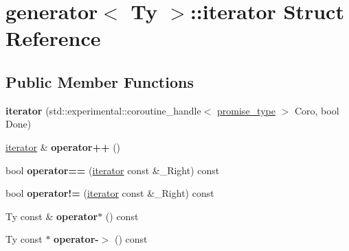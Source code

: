 \hypertarget{structgenerator_1_1iterator}{}\section{generator$<$ Ty $>$\+:\+:iterator Struct Reference}
\label{structgenerator_1_1iterator}
\subsection*{Public Member Functions}
\begin{DoxyCompactItemize}
\item 
\mbox{\label{structgenerator_1_1iterator_a12da4f5d7e28eec038864a62c053eb1e}} 
{\bfseries iterator} (std\+::experimental\+::coroutine\+\_\+handle$<$ \mbox{\hyperlink{structgenerator_1_1promise__type}{promise\+\_\+type}} $>$ Coro, bool Done)
\item 
\mbox{\label{structgenerator_1_1iterator_a193503e58c7841793f734f0c67cfd58e}} 
\mbox{\hyperlink{structgenerator_1_1iterator}{iterator}} \& {\bfseries operator++} ()
\item 
\mbox{\label{structgenerator_1_1iterator_a5097a713b897c0e1bb177fc8b864b909}} 
bool {\bfseries operator==} (\mbox{\hyperlink{structgenerator_1_1iterator}{iterator}} const \&\+\_\+\+Right) const
\item 
\mbox{\label{structgenerator_1_1iterator_a72cdc469cb5622c5efd9e986e7a94210}} 
bool {\bfseries operator!=} (\mbox{\hyperlink{structgenerator_1_1iterator}{iterator}} const \&\+\_\+\+Right) const
\item 
\mbox{\label{structgenerator_1_1iterator_a285b9cb6d3250562fb1ce6b5c39c05fa}} 
Ty const  \& {\bfseries operator$\ast$} () const
\item 
\mbox{\label{structgenerator_1_1iterator_aec163d2585a47a1e8ab96d4e0602c584}} 
Ty const  $\ast$ {\bfseries operator-\/$>$} () const
\end{DoxyCompactItemize}
